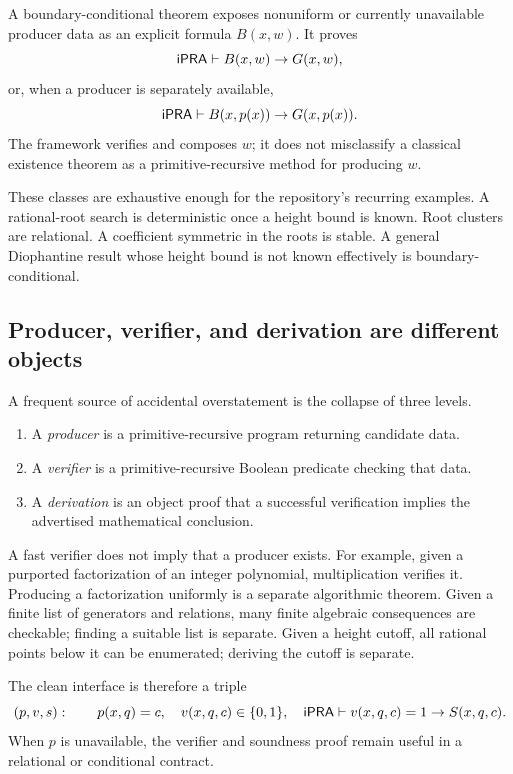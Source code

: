 \begin{definition}
A boundary-conditional theorem exposes nonuniform or currently unavailable producer data as an explicit
formula \(B(x,w)\).  It proves
\[
 \mathsf{iPRA}\vdash B(x,w)\to G(x,w),
\]
or, when a producer is separately available,
\[
 \mathsf{iPRA}\vdash B(x,p(x))\to G(x,p(x)).
\]
The framework verifies and composes \(w\); it does not misclassify a classical existence theorem as a
primitive-recursive method for producing \(w\).
\end{definition}

These classes are exhaustive enough for the repository's recurring examples.  A rational-root search is
deterministic once a height bound is known.  Root clusters are relational.  A coefficient symmetric in the
roots is stable.  A general Diophantine result whose height bound is not known effectively is
boundary-conditional.

\subsection{Producer, verifier, and derivation are different objects}

A frequent source of accidental overstatement is the collapse of three levels.

\begin{enumerate}
  \item A \emph{producer} is a primitive-recursive program returning candidate data.
  \item A \emph{verifier} is a primitive-recursive Boolean predicate checking that data.
  \item A \emph{derivation} is an object proof that a successful verification implies the advertised
        mathematical conclusion.
\end{enumerate}

A fast verifier does not imply that a producer exists.  For example, given a purported factorization of an
integer polynomial, multiplication verifies it.  Producing a factorization uniformly is a separate
algorithmic theorem.  Given a finite list of generators and relations, many finite algebraic consequences
are checkable; finding a suitable list is separate.  Given a height cutoff, all rational points below it can
be enumerated; deriving the cutoff is separate.

The clean interface is therefore a triple
\[
 (p,v,s):\qquad
 p(x,q)=c,
 \quad v(x,q,c)\in\{0,1\},
 \quad \mathsf{iPRA}\vdash v(x,q,c)=1\to S(x,q,c).
\]
When \(p\) is unavailable, the verifier and soundness proof remain useful in a relational or conditional
contract.


